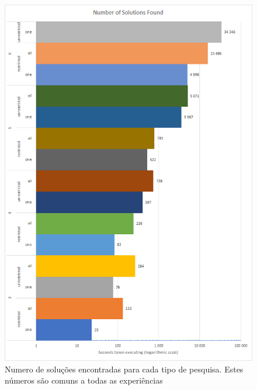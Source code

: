 \begin{figure}[ht]
\centering
\includegraphics[width=\textwidth]{figuras/graphs/solutions.png}
\caption{Numero de soluções encontradas para cada tipo de pesquisa. Estes números são comuns a todas as experiências}
\label{gph:solutions}
\end{figure}